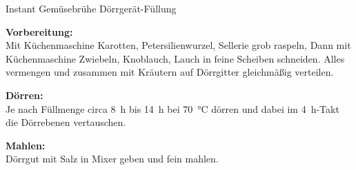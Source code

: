 \begin{MyRecipe}{Instant Gemüsebrühe}{ Dörrgerät-Füllung}{}
	
	
	
	\textbf{Vorbereitung:}\\
	Mit Küchenmaschine Karotten, Petersilienwurzel, Sellerie grob raspeln, Dann mit Küchenmaschine Zwiebeln, Knoblauch, Lauch in feine Scheiben schneiden. Alles vermengen und zusammen mit Kräutern auf Dörrgitter gleichmäßig verteilen.\par\bigskip
	
	\textbf{Dörren:}\\
	Je nach Füllmenge circa \SI{8}{\hour} bis \SI{14}{\hour} bei \SI{70}{\degreeCelsius} dörren und dabei im \SI{4}{\hour}-Takt die Dörrebenen vertauschen.\par\bigskip
	
	\textbf{Mahlen:}\\
	Dörrgut mit Salz in Mixer geben und fein mahlen.
		
\end{MyRecipe}